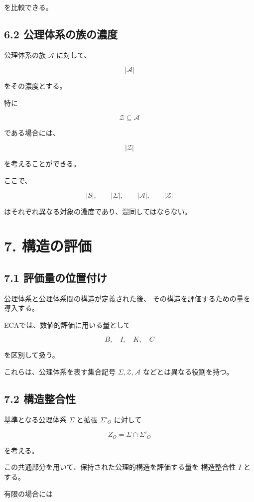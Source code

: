 \documentclass[11pt]{article}
\begin{document}
を比較できる。

\subsection{6.2 公理体系の族の濃度}

公理体系の族 $\mathscr{A}$ に対して、

\[
|\mathscr{A}|
\]

をその濃度とする。

特に

\[
\mathcal{Z}\subseteq\mathscr{A}
\]

である場合には、

\[
|\mathcal{Z}|
\]

を考えることができる。

ここで、

\[
|S|,\qquad
|\Sigma|,\qquad
|\mathscr{A}|,\qquad
|\mathcal{Z}|
\]

はそれぞれ異なる対象の濃度であり、混同してはならない。

\section{7. 構造の評価}

\subsection{7.1 評価量の位置付け}

公理体系と公理体系間の構造が定義された後、
その構造を評価するための量を導入する。

ECAでは、数値的評価に用いる量として

\[
B,\quad I,\quad K,\quad C
\]

を区別して扱う。

これらは、公理体系を表す集合記号
$\Sigma,\mathcal{Z},\mathscr{A}$ などとは異なる役割を持つ。

\subsection{7.2 構造整合性}

基準となる公理体系 $\Sigma$ と拡張 $\Sigma'_O$ に対して

\[
Z_O=\Sigma\cap\Sigma'_O
\]

を考える。

この共通部分を用いて、保持された公理的構造を評価する量を
構造整合性 $I$ とする。

有限の場合には
\end{document}
